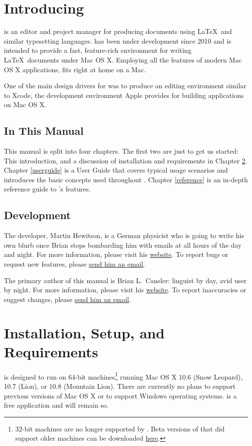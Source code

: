 \chapter{Introducing \texnicle}
\label{intro}
\texnicle is an editor and project manager for producing documents using \LaTeX\ and similar typesetting languages. \texnicle has been under development since 2010 and is intended to provide a fast, feature-rich environment for writing \LaTeX\ documents under Mac OS X. Employing all the features of modern Mac OS X applications, \texnicle fits right at home on a Mac.

One of the main design drivers for \texnicle was to produce an editing environment similar to Xcode, the development environment Apple provides for building applications on Mac OS X.

\section{In This Manual}
\label{inthismanual}
This manual is split into four chapters. The first two are just to get us started: This introduction, and a discussion of installation and requirements in Chapter \ref{requirements}. Chapter \ref{userguide} is a User Guide that covers typical usage scenarios and introduces the basic concepts used throughout \texnicle. Chapter \ref{reference} is an in-depth reference guide to \texnicle’s features.

\section{Development}
\label{dev}
The developer, Martin Hewitson, is a German physicist who is going to write his own blurb once Brian stops bombarding him with emails at all hours of the day and night. For more information, please visit his \href{http://bobsoft-mac.de}{website}. To report bugs or request new features, please \href{mailto:martin@bobsoft-mac.de}{send him an email}.

The primary author of this manual is Brian L.\ Cansler: linguist by day, avid \texnicle user by night. For more information, please visit his \href{http://unc.edu/~bcansler}{website}. To report inaccuracies or suggest changes, please \href{mailto:bcansler@me.com}{send him an email}.

\chapter{Installation, Setup, and Requirements}
\label{requirements}
\texnicle is designed to run on 64-bit machines\footnote{32-bit machines are no longer supported by \texnicle. Beta versions of \texnicle that did support older machines can be downloaded \href{http://bobsoft-mac.de}{here}.} running Mac OS X 10.6 (Snow Leopard), 10.7 (Lion), or 10.8 (Mountain Lion). There are currently no plans to support previous versions of Mac OS X or to support Windows operating systems. \texnicle is a free application and will remain so.

